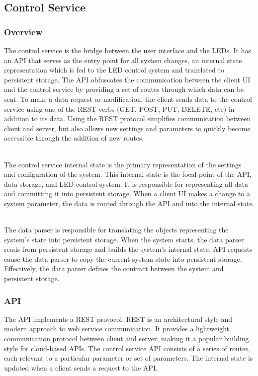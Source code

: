 \documentclass[onecolumn, draftclsnofoot,10pt, compsoc]{IEEEtran}
\begin{document}
		\subsection{Control Service}
			\subsubsection{Overview}
			The control service is the bridge between the user interface and the LEDs.
			It has an API that serves as the entry point for all system changes, an internal state representation which is fed to the LED control system and translated to persistent storage.
			The API obfuscates the communication between the client UI and the control service by providing a set of routes through which data can be sent.
			To make a data request or modification, the client sends data to the control service using one of the REST verbs (GET, POST, PUT, DELETE, etc) in addition to its data.
			Using the REST protocol simplifies communication between client and server, but also allows new settings and parameters to quickly become accessible through the addition of new routes.

			\noindent \\The control service internal state is the primary representation of the settings and configuration of the system.
			This internal state is the focal point of the API, data storage, and LED control system.
			It is responsible for representing all data and committing it into persistent storage.
			When a client UI makes a change to a system parameter, the data is routed through the API and into the internal state.

			\noindent \\The data parser is responsible for translating the objects representing the system's state into persistent storage.
			When the system starts, the data parser reads from persistent storage and builds the system's internal state.
			API requests cause the data parser to copy the current system state into persistent storage.
			Effectively, the data parser defines the contract between the system and persistent storage.

			\subsubsection{API}
			The API implements a REST protocol. REST is an architectural style and modern approach to web service communication. \cite{rest1}
			It provides a lightweight communication protocol between client and server, making it a popular building style for cloud-based APIs.
			The control service API consists of a series of routes, each relevant to a particular parameter or set of parameters.
			The internal state is updated when a client sends a request to the API.
\end{document}
